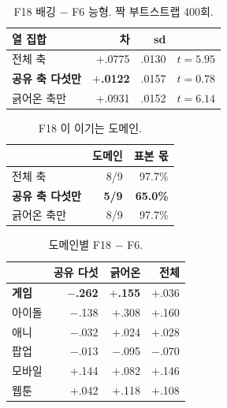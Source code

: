 \documentclass[10pt]{article}
\begin{document}
\begin{table}[t]
\centering\tsize
\caption{F18 배깅 $-$ F6 능형. 짝 부트스트랩 400회.}
\begin{tabular}{lrrl}
\toprule
열 집합 & 차 & sd & \\
\midrule
전체 축 & $+$.0775 & .0130 & $t{=}5.95$ \\
\textbf{공유 축 다섯만} & \textbf{$+$.0122} & .0157 & \textbf{$t{=}0.78$} \\
긁어온 축만 & $+$.0931 & .0152 & $t{=}6.14$ \\
\bottomrule
\end{tabular}
\end{table}

\begin{table}[t]
\centering\tsize
\caption{F18 이 이기는 도메인.}
\begin{tabular}{lrr}
\toprule
& 도메인 & 표본 몫 \\
\midrule
전체 축 & 8/9 & 97.7\% \\
\textbf{공유 축 다섯만} & \textbf{5/9} & \textbf{65.0\%} \\
긁어온 축만 & 8/9 & 97.7\% \\
\bottomrule
\end{tabular}
\end{table}


\begin{table}[t]
\centering\tsize
\caption{도메인별 F18 $-$ F6.}
\begin{tabular}{lrrr}
\toprule
& 공유 다섯 & 긁어온 & 전체 \\
\midrule
\textbf{게임} & \textbf{$-$.262} & \textbf{$+$.155} & $+$.036 \\
아이돌 & $-$.138 & $+$.308 & $+$.160 \\
애니 & $-$.032 & $+$.024 & $+$.028 \\
팝업 & $-$.013 & $-$.095 & $-$.070 \\
\midrule
모바일 & $+$.144 & $+$.082 & $+$.146 \\
웹툰 & $+$.042 & $+$.118 & $+$.108 \\
\bottomrule
\end{tabular}
\end{table}
\end{document}
